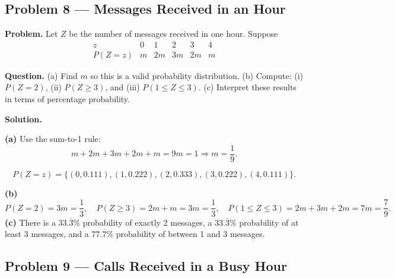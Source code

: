 \begin{ExamProblems}
		
		
		
		\item
		\subsection*{Problem 8 — Messages Received in an Hour}
		
		\textbf{Problem.}
		Let $Z$ be the number of messages received in one hour. Suppose
		\[
		\begin{array}{c|ccccc}
			z & 0 & 1 & 2 & 3 & 4\\
			\hline
			P(Z=z) & m & 2m & 3m & 2m & m
		\end{array}
		\]
		
		\textbf{Question.}
		(a) Find $m$ so this is a valid probability distribution.
		(b) Compute: (i) $P(Z=2)$, (ii) $P(Z\ge 3)$, and (iii) $P(1\le Z\le 3)$.
		(c) Interpret these results in terms of percentage probability.
		
		\textbf{Solution.}

		\textbf{(a)} Use the sum-to-1 rule:
		\[
		m+2m+3m+2m+m=9m=1\Rightarrow m=\frac{1}{9}.
		\]

		
\[
		P(Z=z)=\{(0,0.111),(1,0.222),(2,0.333),(3,0.222),(4,0.111)\}.
		\]
\begin{center}
		\end{center}
\textbf{(b)}
		\[
		P(Z=2)=3m=\frac{1}{3},\quad
		P(Z\ge 3)=2m+m=3m=\frac{1}{3},\quad
		P(1\le Z\le 3)=2m+3m+2m=7m=\frac{7}{9}.
		\]
		\textbf{(c)} There is a $33.\overline{3}\%$ probability of exactly 2 messages, a $33.\overline{3}\%$ probability of at least 3 messages, and a $77.\overline{7}\%$ probability of between 1 and 3 messages.
		
		
		\item
		\subsection*{Problem 9 — Calls Received in a Busy Hour}
		

\end{ExamProblems}
